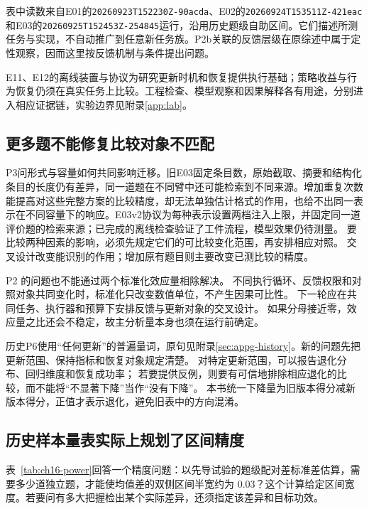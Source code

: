 表中读数来自E01的\texttt{20260923T152230Z-90acda}、E02的\texttt{20260924T153511Z-421eac}和E03的\texttt{20260925T152453Z-254845}运行，沿用历史题级自助区间。它们描述所测任务与实现，不自动推广到任意新任务族。P2b关联的反馈层级在原综述中属于定性观察，因而这里按反馈机制与条件提出问题。

E11、E12的离线装置与协议为研究更新时机和恢复提供执行基础；策略收益与行为恢复仍须在真实任务上比较。工程检查、模型观察和因果解释各有用途，分别进入相应证据链，实验边界见附录\ref{app:lab}。

\subsection{更多题不能修复比较对象不匹配}

P3问形式与容量如何共同影响迁移。旧E03固定条目数，原始截取、摘要和结构化条目的长度仍有差异，同一道题在不同臂中还可能检索到不同来源。增加重复次数能提高对这些完整方案的比较精度，却无法单独估计格式的作用，也给不出同一表示在不同容量下的响应。E03v2协议为每种表示设置两档注入上限，并固定同一道评价题的检索来源；已完成的离线检查验证了工件流程，模型效果仍待测量。
要比较两种因素的影响，必须先规定它们的可比较变化范围，再安排相应对照。
交叉设计改变能识别的作用；增加原有题目则主要改变已测比较的精度。

P2 的问题也不能通过两个标准化效应量相除解决。
不同执行循环、反馈权限和对照对象共同变化时，标准化只改变数值单位，不产生因果可比性。
下一轮应在共同任务、执行器和预算下安排反馈与更新对象的交叉设计。
如果分母接近零，效应量之比还会不稳定，故主分析量本身也须在运行前确定。

历史P6使用“任何更新”的普遍量词，原句见附录\ref{sec:appg-history}。新的问题先把更新范围、保持指标和恢复对象规定清楚。
对特定更新范围，可以报告退化分布、回归维度和恢复成功率；
若要提供反例，则要有可信地排除相应退化的比较，而不能将“不显著下降”当作“没有下降”。
本书统一下降量为旧版本得分减新版本得分，正值才表示退化，避免旧表中的方向混淆。

\subsection{历史样本量表实际上规划了区间精度}

表~\ref{tab:ch16-power}回答一个精度问题：以先导试验的题级配对差标准差估算，需要多少道独立题，才能使均值差的双侧区间半宽约为 $0.03$？这个计算给定区间宽度。若要问有多大把握检出某个实际差异，还须指定该差异和目标功效。

